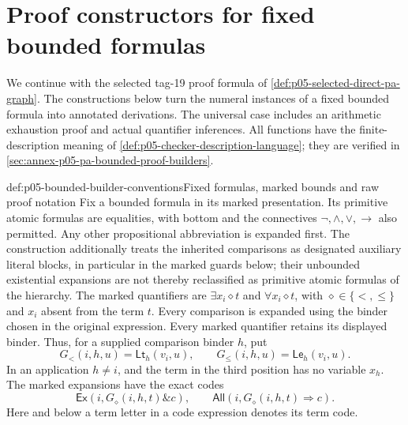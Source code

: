 \section{Proof constructors for fixed bounded formulas}
\label{sec:p05-pa-bounded-proof-builders}

We continue with the selected tag-19 proof formula of
\cref{def:p05-selected-direct-pa-graph}. The constructions below turn the
numeral instances of a fixed bounded formula into annotated derivations.
The universal case includes an arithmetic exhaustion proof and actual
quantifier inferences. All functions have the finite-description meaning of
\cref{def:p05-checker-description-language}; they are verified in
\cref{sec:annex-p05-pa-bounded-proof-builders}.

\begin{hbdefinition}{def:p05-bounded-builder-conventions}{Fixed formulas, marked bounds and raw proof notation}
Fix a bounded formula in its marked presentation. Its primitive atomic
formulas are equalities, with bottom and the connectives
\(\neg,\land,\lor,\to\) also permitted. Any other propositional
abbreviation is expanded first. The construction additionally treats the
inherited comparisons as designated auxiliary literal blocks, in particular
in the marked guards below; their unbounded existential expansions are not
thereby reclassified as primitive atomic formulas of the hierarchy.
The marked quantifiers are \(\exists x_i\mathrel\diamond t\) and
\(\forall x_i\mathrel\diamond t\), with
\(\diamond\in\{<,\leq\}\) and \(x_i\) absent from the term \(t\).
Every comparison is expanded using the binder chosen in the original
expression. Every marked quantifier retains its displayed binder. Thus, for
a supplied comparison binder \(h\), put
\[
 G_<(i,h,u)=\mathsf{Lt}_h(v_i,u),\qquad
 G_{\leq}(i,h,u)=\mathsf{Le}_h(v_i,u).
\]
In an application \(h\ne i\), and the term in the third position has no
variable \(x_h\). The marked expansions have the exact codes
\[
 \mathsf{Ex}(i,G_\diamond(i,h,t)\mathbin{\&}c),\qquad
 \mathsf{All}(i,G_\diamond(i,h,t)\Rightarrow c).
\]
Here and below a term letter in a code expression denotes its term code.


\end{hbdefinition}
